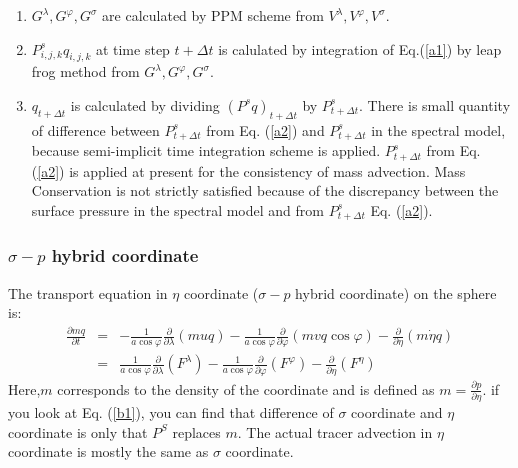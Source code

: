 \documentclass{article}
\begin{document}
\begin{enumerate}
  In order to satisfy the boundary condition, the following correction is made.
  \begin{equation}
    C^{y}_{i,j,k}\leftarrow C^{y}_{i,j,k}-\delta C, \quad C^{y}_{i,j,k}\leftarrow C^{x}_{i,j,k}+\delta C
  \end{equation}
  Here, $\delta C=\sum_{j}C^{y}_{i,j,k}\Delta D_{j,k}/\sum_{j}\Delta D_{j,k}$.
  Vertical velocity $V^{\eta}$ is obtained by using
  \begin{equation}
    \label{a2}
    \frac{\partial P^{S}_{i,j,k}}{\partial t}\sum_{k}\Delta D_{j,k}=\sum_{k}(C^{x}_{i,j,k}+C^{y}_{i,j,k})
  \end{equation}
  (The contents so far are in [TRACEG].  The rest of the content is in [GTRACE])
\item $G^{\lambda}, G^{\varphi}, G^{\sigma}$ are calculated by PPM scheme from $V^{\lambda}, V^{\varphi}, V^{\sigma}$.

\item $P^{s}_{i,j,k}q_{i,j,k}$ at time step $t+\Delta t$ is calulated by integration of Eq.(\ref{a1}) by leap frog method from $G^{\lambda}, G^{\varphi}, G^{\sigma}$.

\item $q_{t+\Delta t}$ is calculated by dividing $(P^{s}q)_{t+\Delta t}$ by $P^{s}_{t+\Delta t}$.
  There is small quantity of difference between $P^{s}_{t+\Delta t}$ from Eq. (\ref{a2}) and $P^{s}_{t+\Delta t}$ in the spectral model, because semi-implicit time integration scheme is applied.
  $P^{s}_{t+\Delta t}$ from Eq. (\ref{a2}) is applied at present for the consistency of mass advection. Mass Conservation is not strictly satisfied because of the discrepancy between the surface pressure in the spectral model and from $P^{s}_{t+\Delta t}$ Eq. (\ref{a2}).
\end{enumerate}

\subsubsection{$\sigma-p$ hybrid coordinate}
The transport equation in $\eta$ coordinate ($\sigma-p$ hybrid coordinate) on the sphere is: 
\begin{eqnarray}                                                             \frac{\partial mq}{\partial t} &=& - \frac{1}{a \cos \varphi} \frac{\partial}{\partial \lambda}(muq)- \frac{1}{a \cos \varphi} \frac{\partial}{\partial \varphi}(mvq \cos \varphi)- \frac{\partial}{\partial \eta} (m \dot{\eta} q)\\                                                                         &=& \frac{1}{a \cos \varphi} \frac{\partial}{\partial \lambda}(F^{\lambda})- \frac{1}{a \cos \varphi} \frac{\partial}{\partial \varphi}(F^{\varphi})-\frac{\partial}{\partial \eta} (F^{\eta})                                    
\end{eqnarray}
Here,$m$ corresponds to the density of the coordinate and is defined as $m=\frac{\partial p}{\partial \eta}$.
if you look at Eq. (\ref{b1}), you can find that difference of $\sigma$ coordinate and $\eta$ coordinate is only that $P^{S}$ replaces $m$.
The actual tracer advection in $\eta$ coordinate is mostly the same as $\sigma$ coordinate.  
\end{document}
